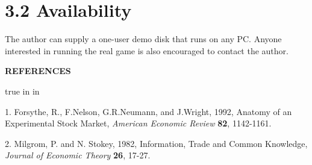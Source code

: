 \section{3.2 Availability}%
The author can supply a one-user demo disk that runs on any PC. 
Anyone interested in running the real game is also encouraged to 
contact the author.  
 
\vfil\break 
 
\centerline{\bf REFERENCES} 
 true in 
 in 
\frenchspacing 
\item{1.} Forsythe, R., F.Nelson, G.R.Neumann, and J.Wright, 1992, 
Anatomy of an 
Experimental Stock Market, {\it American Economic Review} {\bf 82}, 
1142-1161. 
 
\item{2.} Milgrom, P. and N. Stokey, 1982, Information, Trade and 
Common Knowledge, {\it Journal of Economic Theory} {\bf 26}, 17-27. 
 
\bye 
